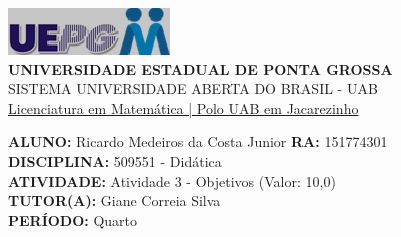 \documentclass[a4paper, 12pt]{article}
\begin{document}
\begin{flushleft}\includegraphics{logo}\\
\textbf{UNIVERSIDADE ESTADUAL DE PONTA GROSSA} \\
SISTEMA UNIVERSIDADE ABERTA DO BRASIL - UAB \\
\underline{Licenciatura em Matemática | Polo UAB em Jacarezinho}\end{flushleft} 
\textbf{ALUNO:} Ricardo Medeiros da Costa Junior   \textbf{RA:} 151774301 \\
\textbf{DISCIPLINA:} 509551 - Didática \\
\textbf{ATIVIDADE:} Atividade 3 - Objetivos (Valor: 10,0) \\ 
\textbf{TUTOR(A):} Giane Correia Silva \\
\textbf{PERÍODO:} Quarto \\\\
\end{document}
